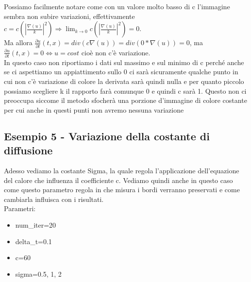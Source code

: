 Possiamo facilmente notare come con un valore molto basso di c l'immagine sembra non subire variazioni, effettivamente
$c=c(|\frac{\nabla(u)}{k}|^2)\Longrightarrow\lim_{k\to0}c(|\frac{\nabla(u)}{k}|^2)=0$.\\
Ma allora $\frac{\partial u}{\partial t}(t,x)=div(c\nabla(u))=div(0*\nabla(u))=0$, ma $\frac{\partial u}{\partial t}(t,x)=0 \Leftrightarrow u=cost$ cioè non c'è variazione.\\
In questo caso non riportiamo i dati sul massimo e sul minimo di c perché anche se ci aspettiamo un appiattimento sullo 0 ci sarà sicuramente qualche punto in cui non c'è variazione di colore la derivata sarà quindi nulla e per quanto piccolo possiamo scegliere k il rapporto farà comunque 0 e quindi c sarà 1. Questo non ci preoccupa siccome il metodo sfocherà una porzione d'immagine di colore costante per cui anche in questi punti non avremo nessuna variazione

\newpage
\subsection{Esempio 5  - Variazione della costante di diffusione}
Adesso vediamo la costante Sigma, la quale regola l'applicazione dell'equazione del calore che influenza il coefficiente c. Vediamo quindi anche in questo caso come questo parametro regola in che misura i bordi verranno preservati e come cambiarla influisca con i risultati.\\
Parametri:
\begin{itemize}
    \item num\_iter=20
    \item delta\_t=0.1
    \item c=60
    \item sigma=0.5, 1, 2
\end{itemize}

